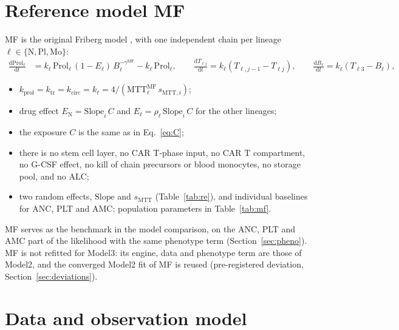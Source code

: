 \documentclass[11pt]{article}
\newcommand{\dd}{\mathrm{d}}
\begin{document}
\section{Reference model MF}\label{sec:mf}
MF is the original Friberg model \citep{friberg2002}, with one independent chain per lineage $\ell\in\{\mathrm{N},\mathrm{Pl},\mathrm{Mo}\}$:
\begin{align}
\frac{\dd \mathrm{Prol}_\ell}{\dd t} &= k_\ell\,\mathrm{Prol}_\ell\,(1-E_\ell)\,B_\ell^{-\gamma^{\mathrm{MF}}} - k_\ell\,\mathrm{Prol}_\ell,\qquad
\frac{\dd T_{\ell j}}{\dd t} = k_\ell(T_{\ell,j-1}-T_{\ell j}),\qquad
\frac{\dd B_\ell}{\dd t} = k_\ell(T_{\ell3}-B_\ell),
\end{align}
\begin{itemize}
\item $k_{\mathrm{prol}}=k_{\mathrm{tr}}=k_{\mathrm{circ}}=k_\ell=4/(\mathrm{MTT}^{\mathrm{MF}}_\ell\,s_{\mathrm{MTT},i})$;
\item drug effect $E_{\mathrm{N}}=\mathrm{Slope}_i\,C$ and $E_\ell=\rho_\ell\,\mathrm{Slope}_i\,C$ for the other lineages;
\item the exposure $C$ is the same as in Eq.~\ref{eq:C};
\item there is no stem cell layer, no CAR T-phase input, no CAR T compartment, no G-CSF effect, no kill of chain precursors or blood monocytes, no storage pool, and no ALC;
\item two random effects, $\mathrm{Slope}$ and $s_{\mathrm{MTT}}$ (Table~\ref{tab:re}), and individual baselines for ANC, PLT and AMC; population parameters in Table~\ref{tab:mf}.
\end{itemize}
MF serves as the benchmark in the model comparison, on the ANC, PLT and AMC part of the likelihood with the same phenotype term (Section~\ref{sec:pheno}). MF is not refitted for Model3: its engine, data and phenotype term are those of Model2, and the converged Model2 fit of MF is reused (pre-registered deviation, Section~\ref{sec:deviations}).

\section{Data and observation model}\label{sec:obs}
\end{document}
